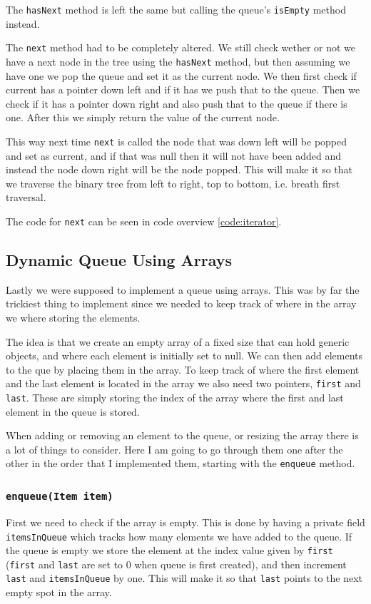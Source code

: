 \documentclass[a4paper,11pt]{article}
\begin{document}
The {\tt hasNext} method is left the same but calling the queue's {\tt isEmpty} method instead.

The {\tt next} method had to be completely altered. We still check wether or not we have a next node in the tree using the {\tt hasNext} method, but
then assuming we have one we pop the queue and set it as the current node. We then first check if current has a pointer down left and if it has we push that to
the queue. Then we check if it has a pointer down right and also push that to the queue if there is one. After this we simply return the value of the current node.

This way next time {\tt next} is called the node that was down left will be popped and set as current, and if that was null then it will not have been added and
instead the node down right will be the node popped. This will make it so that we traverse the binary tree from left to right, top to bottom, i.e. breath first
traversal.

The code for {\tt next} can be seen in code overview \ref{code:iterator}.
\subsection{Dynamic Queue Using Arrays}
\label{met-arrayQueue}
Lastly we were supposed to implement a queue using arrays. This was by far the trickiest thing to implement since
we needed to keep track of where in the array we where storing the elements.

The idea is that we create an empty array of a fixed size that can hold generic objects, and where each element is
initially set to null. We can then add elements to the que by placing them in the array. To keep track of where the first
element and the last element is located in the array we also need two pointers, {\tt first} and {\tt last}. These are
simply storing the index of the array where the first and last element in the queue is stored.

When adding or removing an element to the queue, or resizing the array there is a lot of things to consider.
Here I am going to go through them one after
the other in the order that I implemented them, starting with the {\tt enqueue} method.

\subsubsection{{\tt enqueue(Item item)}}
\label{metmet-enqueue}
First we need to check if the array is empty. This is done by having a private field {\tt itemsInQueue} which tracks
how many elements we have added to the queue. If the queue is empty we store the element at the index value given
by {\tt first} ({\tt first} and {\tt last} are set to 0 when queue is first created), and then increment {\tt last}
and {\tt itemsInQueue} by one. This will make it so that {\tt last} points to the next empty spot in the array.
\end{document}
